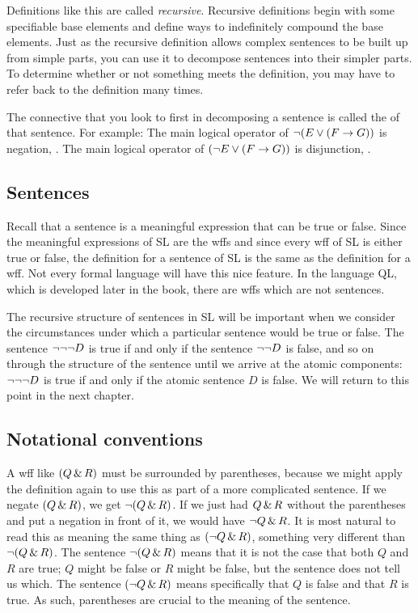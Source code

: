 Definitions like this are called \emph{recursive}. Recursive definitions begin with some specifiable base elements and define ways to indefinitely compound the base elements. Just as the recursive definition allows complex sentences to be built up from simple parts, you can use it to decompose sentences into their simpler parts. To determine whether or not something meets the definition, you may have to refer back to the definition many times.

The connective that you look to first in decomposing a sentence is called the  of that sentence. For example: The main logical operator of $\neg (E \vee (F \rightarrow G))$ is negation, \enot. The main logical operator of $(\neg E \vee (F \rightarrow G))$ is disjunction, \eor.


\subsection{Sentences}
Recall that a sentence is a meaningful expression that can be true or false. Since the meaningful expressions of SL are the wffs and since every wff of SL is either true or false, the definition for a sentence of SL is the same as the definition for a wff. Not every formal language will have this nice feature. In the language QL, which is developed later in the book, there are wffs which are not sentences. 

The recursive structure of sentences in SL will be important when we consider the circumstances under which a particular sentence would be true or false. The sentence $\neg \neg \neg D$ is true if and only if the sentence $\neg \neg D$ is false, and so on through the structure of the sentence until we arrive at the atomic components: $\neg \neg \neg D$ is true if and only if the atomic sentence $D$ is false. We will return to this point in the next chapter.




\subsection{Notational conventions}
\label{SLconventions}
A wff like $(Q \,\&\, R)$ must be surrounded by parentheses, because we might apply the definition again to use this as part of a more complicated sentence. If we negate $(Q \,\&\, R)$, we get $\neg(Q \,\&\, R)$. If we just had $Q \,\&\, R$ without the parentheses and put a negation in front of it, we would have $\neg Q \,\&\, R$. It is most natural to read this as meaning the same thing as $(\neg Q \,\&\, R)$, something very different than $\neg(Q\,\&\, R)$. The sentence $\neg(Q \,\&\, R)$ means that it is not the case that both $Q$ and $R$ are true; $Q$ might be false or $R$ might be false, but the sentence does not tell us which. The sentence $(\neg Q \,\&\, R)$ means specifically that $Q$ is false and that $R$ is true. As such, parentheses are crucial to the meaning of the sentence.


